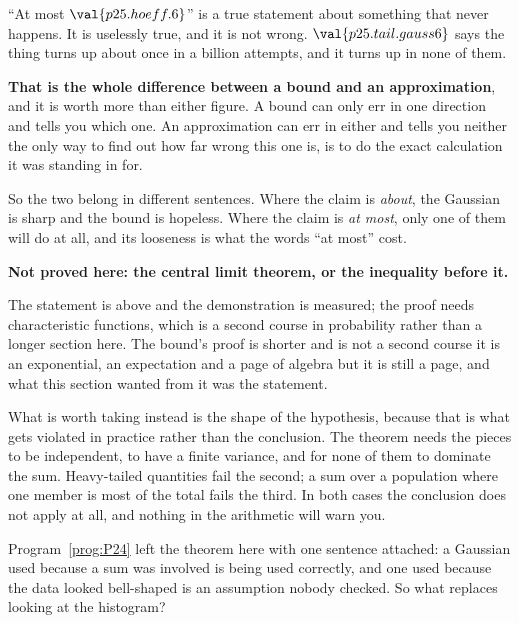 \begin{fr}

\enquote{At most $\val{p25.hoeff.6}$} is a true statement about something that
never happens. It is uselessly true, and it is not wrong.
$\val{p25.tail.gauss6}$ says the thing turns up about once in a billion
attempts, and it turns up in none of them.

\textbf{That is the whole difference between a bound and an approximation}, and
it is worth more than either figure. A bound can only err in one direction and
tells you which one. An approximation can err in either and tells you neither
\dash{} the only way to find out how far wrong this one is, is to do the exact
calculation it was standing in for.

So the two belong in different sentences. Where the claim is \emph{about}, the
Gaussian is sharp and the bound is hopeless. Where the claim is \emph{at
most}, only one of them will do at all, and its looseness is what the words
\enquote{at most} cost.
\end{fr}

\begin{fr}
\begin{rigourbox}
\textbf{Not proved here: the central limit theorem, or the inequality
before it.}

The statement is above and the demonstration is measured; the proof needs
characteristic functions, which is a second course in probability rather than
a longer section here. The bound's proof is shorter and is not a second course
\dash{} it is an exponential, an expectation and a page of algebra \dash{} but
it is still a page, and what this section wanted from it was the statement.

What is worth taking instead is the shape of the hypothesis, because that is
what gets violated in practice rather than the conclusion. The theorem needs
the pieces to be independent, to have a finite variance, and for none of them
to dominate the sum. Heavy-tailed quantities fail the second; a sum over a
population where one member is most of the total fails the third. In both
cases the conclusion does not apply at all, and nothing in the arithmetic will
warn you.
\end{rigourbox}

Program~\ref{prog:P24} left the theorem here with one sentence attached: a
Gaussian used because a sum was involved is being used correctly, and one used
because the data looked bell-shaped is an assumption nobody checked. So what
replaces looking at the histogram?
\dotline
\nextframe
\end{fr}


